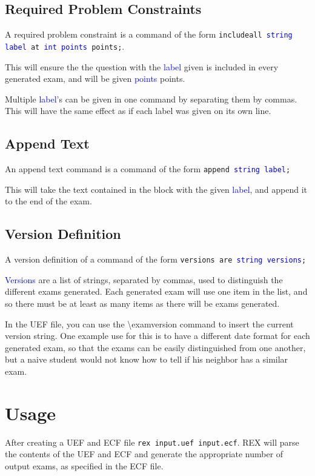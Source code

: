 \documentclass{article}
\begin{document}
\subsection{Required Problem Constraints}
A required problem constraint is a command of the form \texttt{includeall \textcolor{blue}{string label} at \textcolor{blue}{int points} points;}.

This will ensure the the question with the \textcolor{blue}{label} given is included in every
generated exam, and will be given \textcolor{blue}{points} points. 

Multiple \textcolor{blue}{label}'s can be given in one command by separating them by commas. This will have the same effect as if each label was given on its own line.

\subsection{Append Text}
An append text command is a command of the form \texttt{append \textcolor{blue}{string label};}

This will take the text contained in the block with the given \textcolor{blue}{label}, and append it to the end of the exam.

\subsection{Version Definition}
A version definition of a command of the form \texttt{versions are \textcolor{blue}{string versions};}

\textcolor{blue}{Versions} are a list of strings, separated by commas, used to distinguish the different exams generated. Each generated exam will use one item in the list, and so there must be at least as many items as there will be exams generated. 

In the UEF file, you can use the \textbackslash{examversion} command to insert the current version string. One example use for this is to have a different date format for each generated exam, so that the exams can be easily distinguished from one another, but a naive student would not know how to tell if his neighbor has a similar exam.

\section{Usage}
After creating a UEF and ECF file \texttt{rex input.uef input.ecf}.  REX will parse the contents of the UEF and ECF and generate the appropriate number of output exams, as specified in the ECF file.
\end{document}
